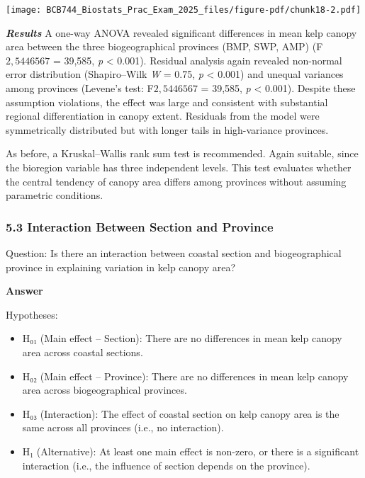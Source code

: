 \documentclass[
  british,
  10pt,
]{article}
\providecommand{\tightlist}{%
  \setlength{\itemsep}{0pt}\setlength{\parskip}{0pt}}
\let\oldtexttt\texttt
\renewcommand{\texttt}[1]{\oldtexttt{\small #1}}
\begin{document}
\begin{center}
\texttt{[image: BCB744\_Biostats\_Prac\_Exam\_2025\_files/figure-pdf/chunk18-2.pdf]}
\end{center}

\textbf{\emph{Results}} A one-way ANOVA revealed significant differences
in mean kelp canopy area between the three biogeographical provinces
(BMP, SWP, AMP) (F\({2,5446567}\) = 39,585, \emph{p} \textless{} 0.001).
Residual analysis again revealed non-normal error distribution
(Shapiro--Wilk \emph{W} = 0.75, \emph{p} \textless{} 0.001) and unequal
variances among provinces (Levene's test: F\({2,5446567}\) = 39,585,
\emph{p} \textless{} 0.001). Despite these assumption violations, the
effect was large and consistent with substantial regional
differentiation in canopy extent. Residuals from the model were
symmetrically distributed but with longer tails in high-variance
provinces.

As before, a Kruskal--Wallis rank sum test is recommended. Again
suitable, since the bioregion variable has three independent levels.
This test evaluates whether the central tendency of canopy area differs
among provinces without assuming parametric conditions.

\subsubsection{5.3 Interaction Between Section and
Province}\label{interaction-between-section-and-province}

Question: Is there an interaction between coastal section and
biogeographical province in explaining variation in kelp canopy area?

\textbf{Answer}

Hypotheses:

\begin{itemize}
\tightlist
\item
  H₀₁ (Main effect -- Section): There are no differences in mean kelp
  canopy area across coastal sections.
\item
  H₀₂ (Main effect -- Province): There are no differences in mean kelp
  canopy area across biogeographical provinces.
\item
  H₀₃ (Interaction): The effect of coastal section on kelp canopy area
  is the same across all provinces (i.e., no interaction).
\item
  H₁ (Alternative): At least one main effect is non-zero, or there is a
  significant interaction (i.e., the influence of section depends on the
  province).
\end{itemize}
\end{document}
